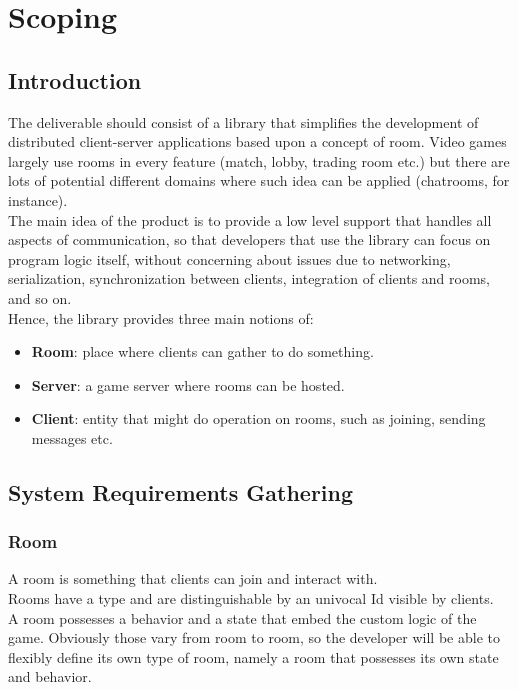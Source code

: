 \chapter{Scoping}

\section{Introduction}

The deliverable should consist of a library that simplifies the development of distributed client-server applications based upon a concept of room. Video games largely use rooms in every feature (match, lobby, trading room etc.) but there are lots of potential different domains where such idea can be applied (chatrooms, for instance).
\\
The main idea of the product is to provide a low level support that handles all aspects of communication, so that developers that use the library can focus on program logic itself, without concerning about issues due to networking, serialization, synchronization between clients, integration of clients and rooms, and so on.
\\
Hence, the library provides three main notions of:
\begin{itemize}
\item \textbf{Room}: place where clients can gather to do something.
\item \textbf{Server}: a game server where rooms can be hosted.
\item \textbf{Client}: entity that might do operation on rooms, such as joining, sending messages etc.
\end{itemize} 

\section{System Requirements Gathering}

\subsection{Room}

A room is something that clients can join and interact with.
\\
Rooms have a type and are distinguishable by an univocal Id visible by clients.
\\
A room possesses a behavior and a state that embed the custom logic of the game. Obviously those vary from room to room, so the developer will be able to flexibly define its own type of room, namely a room that possesses its own state and behavior.

